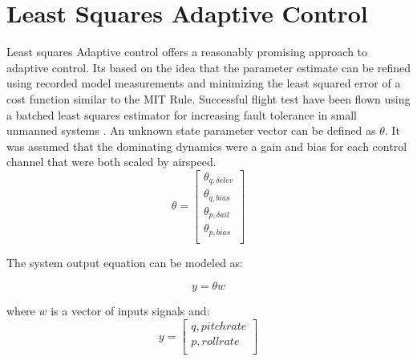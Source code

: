 \section{Least Squares Adaptive Control}
Least squares Adaptive control offers a reasonably promising approach to adaptive control.  Its based on the idea that the parameter estimate can be refined using recorded model measurements and minimizing the least squared error of a cost function similar to the MIT Rule.  Successful flight test have been flown using a batched least squares estimator for increasing fault tolerance in small unmanned systems \cite{shore2004flight}.  An unknown state parameter vector can be defined as $\theta$.  It was assumed that the dominating dynamics were a gain and bias for each control channel that were both scaled by airspeed.
\begin{equation}
\theta=  		\begin{bmatrix}
           			\theta _{q,\delta elev} \\  %
           			\theta _{q,bias}  \\
           			\theta _{p,\delta ail} \\ 
           			\theta _{p,bias}  \\
        		 	\end{bmatrix}
\end{equation}

The system output equation can be modeled as:

\begin{equation}
y =  \theta w
\end{equation}

where $w$ is a vector of inputs signals and:
\begin{equation}
y =  		\begin{bmatrix}
			q, pitch rate \\
			p, roll rate \\
        		 \end{bmatrix}
\end{equation}














